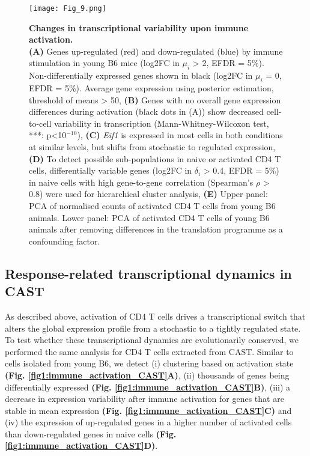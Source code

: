 \begin{figure}[!ht]
\centering
\texttt{[image: Fig\_9.png]}
\caption[Changes in transcriptional variability upon immune activation]{\textbf{Changes in transcriptional variability upon immune activation.}\\
\textbf{(A)} Genes up-regulated (red) and down-regulated (blue) by immune stimulation in young B6 mice (log2FC in $\mu_i$ > 2, EFDR = 5\%). Non-differentially expressed genes shown in black (log2FC in $\mu_i$ = 0, EFDR = 5\%). Average gene expression using posterior estimation, threshold of means > 50, \textbf{(B)} Genes with no overall gene expression differences during activation (black dots in (A)) show decreased cell-to-cell variability in transcription (Mann-Whitney-Wilcoxon test, ***: p<10$^{-10}$), \textbf{(C)} \textit{Eif1} is expressed in most cells in both conditions at similar levels, but shifts from stochastic to regulated expression, \textbf{(D)} To detect possible sub-populations in naive or activated CD4\plus{} T cells, differentially variable genes (log2FC in $\delta_i$ > 0.4, EFDR = 5\%) in naive cells with high gene-to-gene correlation (Spearman’s $\rho$ > 0.8) were used for hierarchical cluster analysis, \textbf{(E)} Upper panel: PCA of normalised counts of activated CD4\plus{} T cells from young B6 animals. Lower panel: PCA of activated CD4\plus{} T cells of young B6 animals after removing differences in the translation programme as a confounding factor.}
\label{fig1:immune_variability}
\end{figure}

\newpage


\subsection{Response-related transcriptional dynamics in CAST}

As described above, activation of CD4\plus{} T cells drives a transcriptional switch that alters the global expression profile from a stochastic to a tightly regulated state. To test whether these transcriptional dynamics are evolutionarily conserved, we performed the same analysis for CD4\plus{} T cells extracted from CAST. Similar to cells isolated from young B6, we detect (i) clustering based on activation state \textbf{(Fig. \ref{fig1:immune_activation_CAST}A)}, (ii)  thousands of genes being differentially expressed \textbf{(Fig. \ref{fig1:immune_activation_CAST}B)}, (iii) a decrease in expression variability after immune activation for genes that are stable in mean expression \textbf{(Fig. \ref{fig1:immune_activation_CAST}C)} and (iv) the expression of up-regulated genes in a higher number of activated cells than down-regulated genes in naive cells \textbf{(Fig. \ref{fig1:immune_activation_CAST}D)}.

